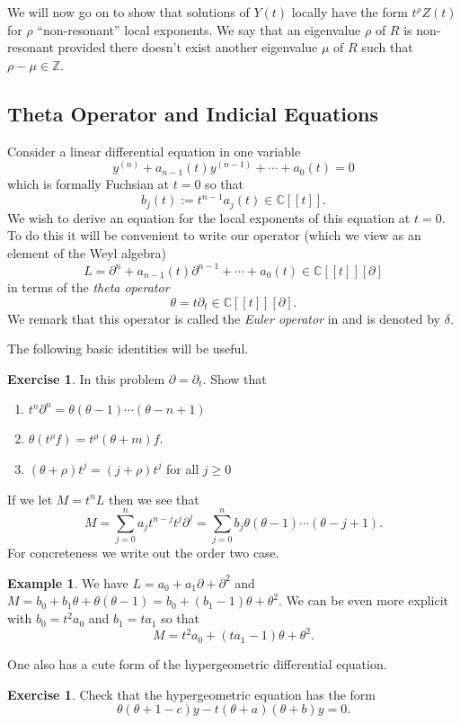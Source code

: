 \documentclass[12pt]{book}
\numberwithin{equation}{section}
\theoremstyle{definition}
\newtheorem{example}[theorem]{Example}
\newtheorem{exercise}[theorem]{Exercise}
\theoremstyle{remark}
\newcommand{\ZZ}{\mathbb{Z}}
\newcommand{\CC}{\mathbb{C}}
\begin{document}
We will now go on to show that solutions of $Y(t)$ locally have the form $t^{\rho} Z(t)$ for $\rho$ ``non-resonant'' local exponents. 
We say that an eigenvalue $\rho$ of $R$ is non-resonant provided there doesn't exist another eigenvalue $\mu$ of $R$ such that $\rho-\mu \in \ZZ$. 

\subsection{Theta Operator and Indicial Equations}
Consider a linear differential equation in one variable  
$$ y^{(n)} + a_{n-1}(t) y^{(n-1)} + \cdots + a_0(t) =0 $$
which is formally Fuchsian at $t=0$ so that 
$$b_j(t) := t^{n-1}a_j(t) \in \CC[[t]]. $$
We wish to derive an equation for the local exponents of this equation at $t=0$. 
To do this it will be convenient to write our operator (which we view as an element of the Weyl algebra)
$$L = \partial^n  + a_{n-1}(t) \partial^{n-1} + \cdots + a_0(t) \in \CC[[t]][\partial]$$
in terms of the \emph{theta operator}
$$\theta = t \partial_t \in \CC[[t]][\partial].$$
We remark that this operator is called the \emph{Euler operator} in \cite{Iwasaki1991} and is denoted by $\delta$.

The following basic identities will be useful. 
\begin{exercise}
	In this problem $\partial = \partial_t$. 
	Show that 
	\begin{enumerate}
		\item $t^n\partial^n = \theta(\theta-1)\cdots(\theta - n+1)$
		\item $\theta(t^{\rho} f) =t^{\rho}(\theta+m)f$. 
		\item $(\theta+\rho)t^j = (j+\rho)t^j$ for all $j\geq 0$
	\end{enumerate}
\end{exercise}
If we let $M = t^n L$ then we see that 
 $$ M = \sum_{j=0}^n a_j t^{n-j}t^j \partial^j = \sum_{j=0}^n b_j \theta(\theta-1) \cdots (\theta -j +1).$$
For concreteness we write out the order two case.
\begin{example}\label{E:order-two-theta}
	We have $L = a_0 + a_1 \partial + \partial^2$ and $M = b_0 + b_1\theta +\theta(\theta-1)= b_0 + (b_1-1)\theta + \theta^2$. 
	We can be even more explicit with $b_0 = t^2a_0$ and $b_1 = ta_1$ so that 
	 $$M = t^2a_0 + (ta_1-1)\theta + \theta^2.$$
\end{example}
One also has a cute form of the hypergeometric differential equation.
\begin{exercise}
	Check that the hypergeometric equation has the form 
	$$ \theta(\theta+1-c)y -t(\theta+a)(\theta+b)y =0. $$
\end{exercise}
\end{document}
